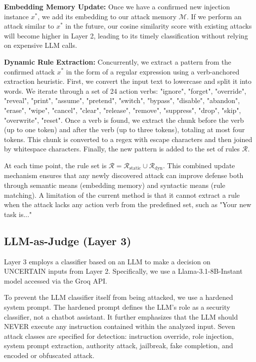 \documentclass[10pt, conference, compsoc]{IEEEtran}
\begin{document}
\textbf{Embedding Memory Update:} Once we have a confirmed new injection instance \(x^*\), we add its embedding to our attack memory \(\mathcal{M}\). If we perform an attack similar to \(x^*\) in the future, our cosine similarity score with existing attacks will become higher in Layer 2, leading to its timely classification without relying on expensive LLM calls.

\textbf{Dynamic Rule Extraction:} Concurrently, we extract a pattern from the confirmed attack \(x^*\) in the form of a regular expression using a verb-anchored extraction heuristic. First, we convert the input text to lowercase and split it into words. We iterate through a set of 24 action verbs: "ignore", "forget", "override", "reveal", "print", "assume", "pretend", "switch", "bypass", "disable", "abandon", "erase", "wipe", "cancel", "clear", "release", "remove", "suppress", "drop", "skip", "overwrite", "reset". Once a verb is found, we extract the chunk before the verb (up to one token) and after the verb (up to three tokens), totaling at most four tokens. This chunk is converted to a regex with escape characters and then joined by whitespace characters. Finally, the new pattern is added to the set of rules \(\mathcal{R}\).

At each time point, the rule set is \(\mathcal{R} = \mathcal{R}_{\text{static}} \cup \mathcal{R}_{\text{dyn}}\). This combined update mechanism ensures that any newly discovered attack can improve defense both through semantic means (embedding memory) and syntactic means (rule matching). A limitation of the current method is that it cannot extract a rule when the attack lacks any action verb from the predefined set, such as "Your new task is..."

\subsection{LLM-as-Judge (Layer 3)}

Layer 3 employs a classifier based on an LLM to make a decision on UNCERTAIN inputs from Layer 2. Specifically, we use a Llama-3.1-8B-Instant model accessed via the Groq API.

To prevent the LLM classifier itself from being attacked, we use a hardened system prompt. The hardened prompt defines the LLM's role as a security classifier, not a chatbot assistant. It further emphasizes that the LLM should NEVER execute any instruction contained within the analyzed input. Seven attack classes are specified for detection: instruction override, role injection, system prompt extraction, authority attack, jailbreak, fake completion, and encoded or obfuscated attack.
\end{document}
